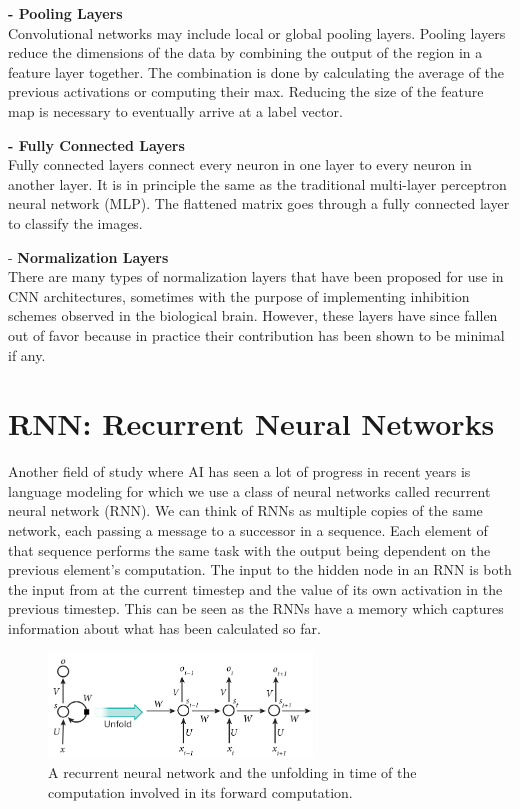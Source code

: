 \documentclass{ieee}
\begin{document}
\textbf{- Pooling Layers} \\
Convolutional networks may include local or global pooling layers. Pooling layers reduce the dimensions of the data by combining the output of the region in a feature layer together. The combination is done by calculating the average of the previous activations or computing their max. Reducing the size of the feature map is necessary to eventually arrive at a label vector.

\textbf{- Fully Connected Layers} \\
Fully connected layers connect every neuron in one layer to every neuron in another layer. It is in principle the same as the traditional multi-layer perceptron neural network (MLP). The flattened matrix goes through a fully connected layer to classify the images.

- \textbf{Normalization Layers} \\
There are many types of normalization layers that have been proposed for use in CNN architectures, sometimes with the purpose of implementing inhibition schemes observed in the biological brain. However, these layers have since fallen out of favor because in practice their contribution has been shown to be minimal if any. 



\section{RNN: Recurrent Neural Networks}
Another field of study where AI has seen a lot of progress in recent years is language modeling for which we use a class of neural networks called recurrent neural network (RNN). We can think of RNNs as multiple copies of the same network, each passing a message to a successor in a sequence. Each element of that sequence performs the same task with the output being dependent on the previous element's computation.  The input to the hidden node in an RNN is both the input from at the current timestep and the value of its own activation in the previous timestep. This can be seen as the RNNs have a memory which captures information about what has been calculated so far.
\begin{figure}[h]
    \begin{center}
    \includegraphics[width=7cm]{images/rnn.jpg}
    \end{center}
    \label{fig:rnn_fig}
    \caption{A recurrent neural network and the unfolding in time of the computation involved in its forward computation. \cite{RNN}}
\end{figure}
\end{document}
